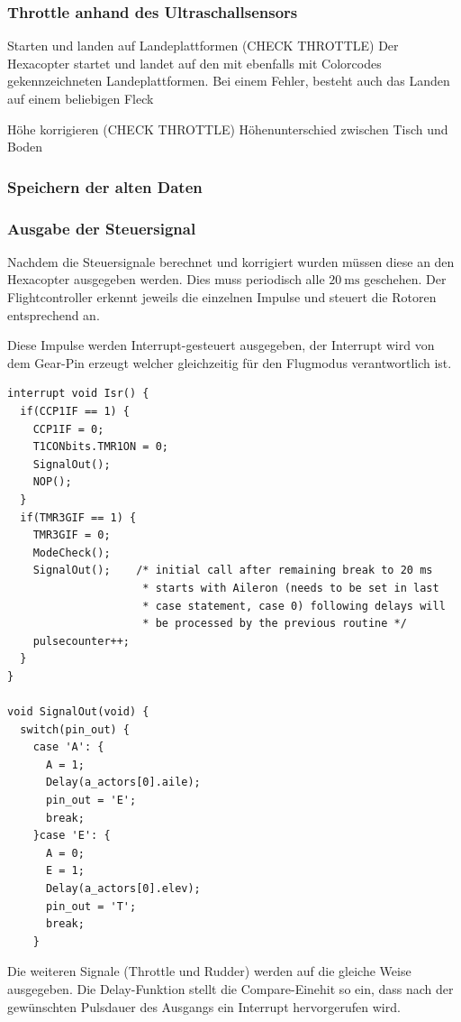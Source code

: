    \subsubsection{Throttle anhand des Ultraschallsensors}

    Starten und landen auf Landeplattformen (CHECK THROTTLE)
    Der Hexacopter startet und landet auf den mit ebenfalls mit Colorcodes gekennzeichneten Landeplattformen.
    Bei einem Fehler, besteht auch das Landen auf einem beliebigen Fleck

    Höhe korrigieren (CHECK THROTTLE)
    Höhenunterschied zwischen Tisch und Boden

    \subsubsection{Speichern der alten Daten}

    \subsubsection{Ausgabe der Steuersignal}
    Nachdem die Steuersignale berechnet und korrigiert wurden müssen diese an den Hexacopter ausgegeben werden. Dies muss periodisch alle $\SI{20}{\milli\second}$ geschehen.
    Der Flightcontroller erkennt jeweils die einzelnen Impulse und steuert die Rotoren entsprechend an.

    Diese Impulse werden Interrupt-gesteuert ausgegeben, der Interrupt wird von dem Gear-Pin erzeugt welcher gleichzeitig für den Flugmodus verantwortlich ist.

    \lstset{language = c}
    \begin{lstlisting}
interrupt void Isr() {
  if(CCP1IF == 1) {
    CCP1IF = 0;
    T1CONbits.TMR1ON = 0;
    SignalOut();
    NOP();
  }
  if(TMR3GIF == 1) {
    TMR3GIF = 0;
    ModeCheck();
    SignalOut();    /* initial call after remaining break to 20 ms
                     * starts with Aileron (needs to be set in last
                     * case statement, case 0) following delays will
                     * be processed by the previous routine */
    pulsecounter++;
  }
}

void SignalOut(void) {
  switch(pin_out) {
    case 'A': {
      A = 1;
      Delay(a_actors[0].aile);
      pin_out = 'E';
      break;
    }case 'E': {
      A = 0;
      E = 1;
      Delay(a_actors[0].elev);
      pin_out = 'T';
      break;
    }
    \end{lstlisting}
    Die weiteren Signale (Throttle und Rudder) werden auf die gleiche Weise ausgegeben.
    Die Delay-Funktion stellt die Compare-Einehit so ein, dass nach der gewünschten Pulsdauer des Ausgangs ein Interrupt hervorgerufen wird.


